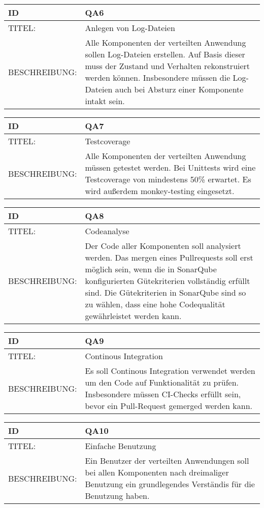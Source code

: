 \begin{tabularx}{16cm}{l|X}
	 \textbf{ID} & \textbf{QA6} \\
	 \hline
		TITEL: & Anlegen von Log-Dateien\\ 
	 \hline 
	 BESCHREIBUNG: & Alle Komponenten der verteilten Anwendung sollen Log-Dateien erstellen. Auf Basis dieser muss der Zustand und Verhalten rekonstruiert werden können. Insbesondere müssen die Log-Dateien auch bei Absturz einer Komponente intakt sein. 
\end{tabularx} 


\begin{tabularx}{16cm}{l|X}
	 \textbf{ID} & \textbf{QA7} \\
	 \hline
		TITEL: & Testcoverage\\ 
	 \hline 
	 BESCHREIBUNG: & Alle Komponenten der verteilten Anwendung müssen getestet werden. Bei Unittests wird eine Testcoverage von mindestens 50\% erwartet. Es wird außerdem monkey-testing eingesetzt. 
\end{tabularx} 



\begin{tabularx}{16cm}{l|X}
	 \textbf{ID} & \textbf{QA8} \\
	 \hline
		TITEL: & Codeanalyse\\ 
	 \hline 
	 BESCHREIBUNG: & Der Code aller Komponenten soll analysiert werden. Das mergen eines Pullrequests soll erst möglich sein, wenn die in SonarQube konfigurierten Gütekriterien vollständig erfüllt sind. Die Gütekriterien in SonarQube sind so zu wählen, dass eine hohe Codequalität gewährleistet werden kann. 
\end{tabularx} 


\begin{tabularx}{16cm}{l|X}
	 \textbf{ID} & \textbf{QA9} \\
	 \hline
		TITEL: & Continous Integration\\ 
	 \hline 
	 BESCHREIBUNG: & Es soll Continous Integration verwendet werden um den Code auf Funktionalität zu prüfen. Insbesondere müssen CI-Checks erfüllt sein, bevor ein Pull-Request gemerged werden kann.
\end{tabularx} 


\begin{tabularx}{16cm}{l|X}
	 \textbf{ID} & \textbf{QA10} \\
	 \hline
		TITEL: & Einfache Benutzung\\ 
	 \hline 
	 BESCHREIBUNG: & Ein Benutzer der verteilten Anwendungen soll bei allen Komponenten nach dreimaliger Benutzung ein grundlegendes Verständis für die Benutzung haben. 
\end{tabularx} 

